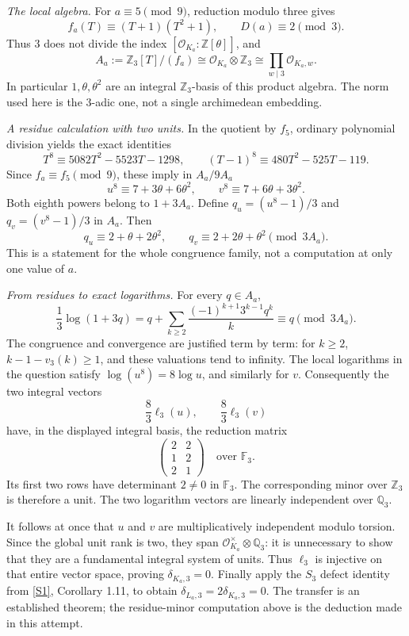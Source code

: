 \documentclass[11pt,a4paper]{article}
\newcommand{\Z}{\mathbb{Z}}
\newcommand{\Q}{\mathbb{Q}}
\newcommand{\F}{\mathbb{F}}
\newcommand{\sref}[2]{\hyperlink{source:#1:#2}{[S#2]}}
\numberwithin{equation}{section}
\begin{document}
\textit{The local algebra.} For $a\equiv5\pmod9$, reduction modulo three
gives
\[
 f_a(T)\equiv(T+1)(T^2+1),\qquad D(a)\equiv2\pmod3.
\]
Thus $3$ does not divide the index $[\mathcal O_{K_a}:\Z[\theta]]$, and
\[
 A_a:=\Z_3[T]/(f_a)\cong\mathcal O_{K_a}\otimes\Z_3
          \cong\prod_{w\mid3}\mathcal O_{K_a,w}.
\]
In particular $1,\theta,\theta^2$ are an integral $\Z_3$-basis of this
product algebra. The norm used here is the $3$-adic one, not a single
archimedean embedding.

\textit{A residue calculation with two units.} In the quotient by $f_5$,
ordinary polynomial division yields the exact identities
\[
 T^8\equiv5082T^2-5523T-1298,\qquad
 (T-1)^8\equiv480T^2-525T-119.
\]
Since $f_a\equiv f_5\pmod9$, these imply in $A_a/9A_a$
\[
 u^8\equiv7+3\theta+6\theta^2,
 \qquad v^8\equiv7+6\theta+3\theta^2.
\]
Both eighth powers belong to $1+3A_a$. Define
$q_u=(u^8-1)/3$ and $q_v=(v^8-1)/3$ in $A_a$. Then
\begin{equation}\label{eq156-residues}
 q_u\equiv2+\theta+2\theta^2,\qquad
 q_v\equiv2+2\theta+\theta^2\pmod{3A_a}.
\end{equation}
This is a statement for the whole congruence family, not a computation at
only one value of $a$.

\textit{From residues to exact logarithms.} For every $q\in A_a$,
\[
 \frac13\log(1+3q)
 =q+\sum_{k\ge2}\frac{(-1)^{k+1}3^{k-1}q^k}{k}
 \equiv q\pmod{3A_a}.
\]
The congruence and convergence are justified term by term: for $k\ge2$,
$k-1-v_3(k)\ge1$, and these valuations tend to infinity. The local
logarithms in the question satisfy $\log(u^8)=8\log u$, and similarly for
$v$. Consequently the two integral vectors
\[
 \frac83\ell_3(u),\qquad\frac83\ell_3(v)
\]
have, in the displayed integral basis, the reduction matrix
\begin{equation}\label{eq156-minor}
 \begin{pmatrix}2&2\\1&2\\2&1\end{pmatrix}\quad\text{over }\F_3.
\end{equation}
Its first two rows have determinant $2\ne0$ in $\F_3$. The corresponding
minor over $\Z_3$ is therefore a unit. The two logarithm vectors are
linearly independent over $\Q_3$.

It follows at once that $u$ and $v$ are multiplicatively independent modulo
torsion. Since the global unit rank is two, they span
$\mathcal O_{K_a}^{\times}\otimes\Q_3$: it is unnecessary to show that they
are a fundamental integral system of units. Thus $\ell_3$ is injective on
that entire vector space, proving $\delta_{K_a,3}=0$. Finally apply the
$S_3$ defect identity from \sref{156}{1}, Corollary 1.11, to obtain
$\delta_{L_a,3}=2\delta_{K_a,3}=0$. The transfer is an established theorem;
the residue-minor computation above is the deduction made in this attempt.
\end{document}
